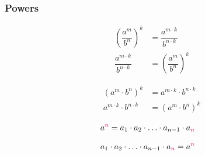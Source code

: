 \documentclass[20150903-160354-rs2.2-MarksMathNotebook.tex]{subfiles}
\begin{document}













\subsubsection{Powers}


\begin{arule}
\begin{subequations}
\begin{align}
	\left(\dfrac{a^m}{b^n}\right)^k &= \dfrac{a^{m \cdot k}}{b^{n\cdot k}} \label{eq:poqpo1}\\
	\dfrac{a^{m \cdot k}}{b^{n\cdot k}} &= \left(\dfrac{a^m}{b^n}\right)^k \label{eq:poqpo2}
\end{align}
\end{subequations}
\end{arule}

\begin{arule}
\begin{subequations}
\begin{align}
	\left(a^m \cdot b^n\right)^k &= a^{m \cdot k} \cdot b^{n\cdot k} \label{eq:poprpo1}\\
	a^{m \cdot k} \cdot b^{n \cdot k} &= \left(a^m \cdot b^n\right)^k \label{eq:poprpo2}
\end{align}
\end{subequations}
\end{arule}

\begin{definition}
\begin{align}
a^{\alert{n}} &= a_1 \cdot a_2 \cdot \ldots \cdot a_{n-1} \cdot a_{\alert{n}} \label{eq:potf}
\end{align}
\end{definition}

\begin{definition}
\begin{align}
a_1 \cdot a_2 \cdot \ldots \cdot a_{n-1} \cdot a_{\alert{n}} &= a^{\alert{n}} \label{eq:ftpo}
\end{align}
\end{definition}
\end{document}
